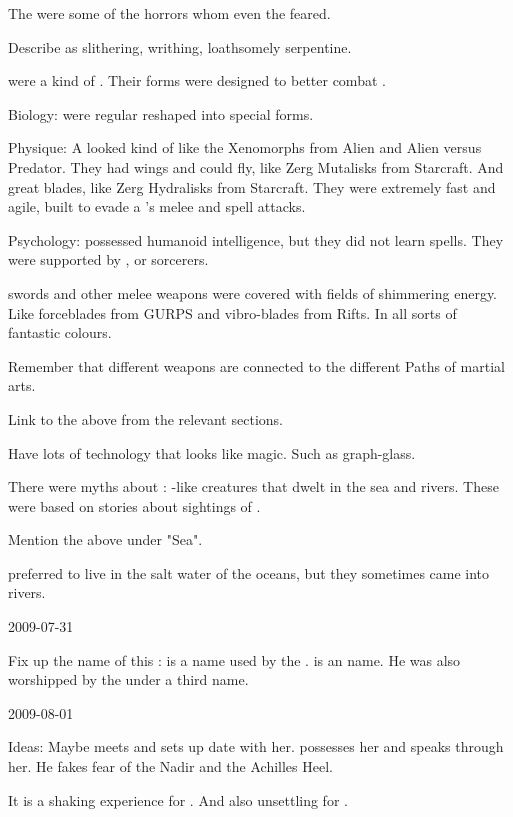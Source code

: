 The \flyingpolyps were some of the horrors whom even the \resphain feared.


Describe \Nasshikerr as slithering, writhing, loathsomely serpentine.


\Screamers were a kind of \banes. 
Their forms were designed to better combat \dragons. 

Biology:
  \Screamers were regular \banes reshaped into special forms. 

Physique:
  A \screamer looked kind of like the Xenomorphs from Alien and Alien versus Predator. 
  They had wings and could fly, like Zerg Mutalisks from Starcraft. 
  And great blades, like Zerg Hydralisks from Starcraft. 
  They were extremely fast and agile, built to evade a \dragon's melee and spell attacks. 

Psychology:
  \Screamers possessed humanoid intelligence, but they did not learn spells. 
  They were supported by \lesserbane, \baneknight or \banelord sorcerers. 


\Resphan swords and other melee weapons were covered with fields of shimmering energy.
Like forceblades from GURPS and vibro-blades from Rifts.
In all sorts of fantastic colours. 

Remember that different weapons are connected to the different Paths of \resphan martial arts. 

Link to the above from the relevant sections. 

Have lots of technology that looks like magic. 
Such as graph-glass.


There were myths about : 
\Scatha-like creatures that dwelt in the sea and rivers. 
These were based on stories about sightings of \nagae. 

Mention the above under "Sea". 

\Nagae preferred to live in the salt water of the oceans, but they sometimes came into rivers. 



2009-07-31

Fix up the name of this \xs:
\Kythraxas is a name used by the \dragons.
\KythemCreiza is an \Ortaican name.
He was also worshipped by the \nagae under a third name. 



2009-08-01

Ideas:
  Maybe \Teshrial meets \Criseis and sets up date with her.
  \Ishnaruchaefir possesses her and speaks through her.
  He fakes fear of the Nadir and the Achilles Heel.
  
  It is a shaking experience for \Criseis.
  And also unsettling for \Teshrial. 



















